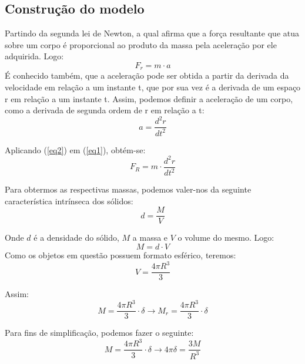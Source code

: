 \subsection{Construção do modelo}
Partindo da segunda lei de Newton, a qual afirma que a força resultante que atua sobre um corpo é proporcional ao produto da massa pela aceleração por ele adquirida. Logo:
\begin{equation}\label{eq1}
F_{r} = m \cdot a
\end{equation}
É conhecido também, que a aceleração pode ser obtida a partir da derivada da velocidade em relação a um instante t, que por sua vez é a derivada de um espaço r em relação a um instante t. Assim, podemos definir a aceleração de um corpo, como a derivada de segunda ordem de r em relação a t:\\

\begin{equation}\label{eq2}
a = \frac{d^{2}r}{dt^{2}}
\end{equation}

\noindent Aplicando (\ref{eq2}) em (\ref{eq1}), obtém-se:
\begin{equation}\label{eqf}
F_{R} = m \cdot \frac{d^{2}r}{dt^{2}}
\end{equation}

\noindent Para obtermos as respectivas massas, podemos valer-nos da seguinte característica intrínseca dos sólidos:
\begin{equation*}
d= \frac{M}{V}
\end{equation*}

\noindent Onde $d$ é a densidade do sólido, $M$ a massa e $V$ o volume do mesmo.
Logo:
\begin{equation*}
M = d \cdot V
\end{equation*}
\noindent Como os objetos em questão possuem formato esférico, teremos:
\begin{equation*}
V = \frac{4\pi R^{3}}{3}
\end{equation*}

\noindent Assim:
\begin{equation}\label{eq3}
M = \frac{4\pi R^{3}}{3} \cdot \delta \rightarrow M_{r} = \frac{4\pi R^{3}}{3} \cdot \delta
\end{equation}

\noindent Para fins de simplificação, podemos fazer o seguinte:
\begin{equation}\label{eq4}
M = \frac{4\pi R^{3}}{3} \cdot \delta \rightarrow 4\pi \delta = \frac{3M}{R^{3}}
\end{equation}

